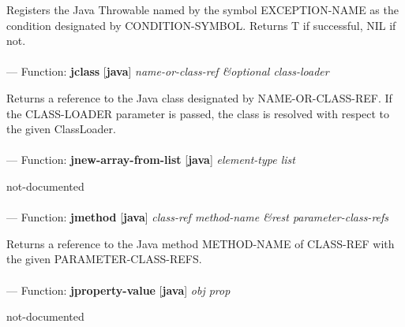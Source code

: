 \begin{adjustwidth}{5em}{5em}
Registers the Java Throwable named by the symbol EXCEPTION-NAME as the condition designated by CONDITION-SYMBOL.  Returns T if successful, NIL if not.
\end{adjustwidth}

\paragraph{}
\label{JAVA:JCLASS}
--- Function: \textbf{jclass} [\textbf{java}] \textit{name-or-class-ref \&optional class-loader}

\begin{adjustwidth}{5em}{5em}
Returns a reference to the Java class designated by NAME-OR-CLASS-REF. If the CLASS-LOADER parameter is passed, the class is resolved with respect to the given ClassLoader.
\end{adjustwidth}

\paragraph{}
\label{JAVA:JNEW-ARRAY-FROM-LIST}
--- Function: \textbf{jnew-array-from-list} [\textbf{java}] \textit{element-type list}

\begin{adjustwidth}{5em}{5em}
not-documented
\end{adjustwidth}

\paragraph{}
\label{JAVA:JMETHOD}
--- Function: \textbf{jmethod} [\textbf{java}] \textit{class-ref method-name \&rest parameter-class-refs}

\begin{adjustwidth}{5em}{5em}
Returns a reference to the Java method METHOD-NAME of CLASS-REF with the given PARAMETER-CLASS-REFS.
\end{adjustwidth}

\paragraph{}
\label{JAVA:JPROPERTY-VALUE}
--- Function: \textbf{jproperty-value} [\textbf{java}] \textit{obj prop}

\begin{adjustwidth}{5em}{5em}
not-documented
\end{adjustwidth}

